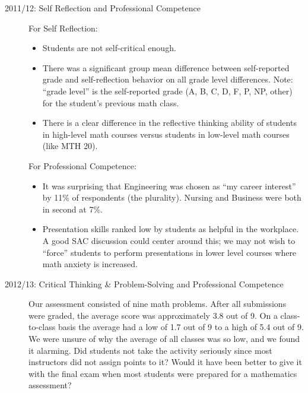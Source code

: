 \begin{description}

	\item[2011/12: Self Reflection and Professional Competence]
	For Self Reflection:
	\begin{itemize}
		\item Students are not self-critical enough.
		\item There was a significant group mean difference between self-reported grade
		and self-reflection behavior on all grade level differences.  Note: ``grade
		level'' is the self-reported grade (A, B, C, D, F, P, NP, other) for the
		student's previous math class.
		\item There is a clear difference in the reflective thinking ability of students
		in high-level math courses versus students in low-level math courses (like MTH
		20).
	\end{itemize}
	For Professional Competence:
	\begin{itemize}
		\item It was surprising that Engineering was chosen as ``my career interest'' by
		11\% of respondents (the plurality). Nursing and Business were both in second
		at 7\%.
		\item Presentation skills ranked low by students as helpful in the workplace.
		A good SAC discussion could center around this; we may not
		wish to ``force'' students to perform presentations in lower level courses where math
		anxiety is increased.
	\end{itemize}

	\item[2012/13:  Critical Thinking \& Problem-Solving and Professional Competence]

	Our assessment consisted of nine math problems.  After all submissions were
	graded, the average score was approximately 3.8 out of 9.  On a class-to-class
	basis the average had a low of 1.7 out of 9 to a high of 5.4 out of 9.  We were
	unsure of why the average of all classes was so low, and we found it alarming.
	Did students not take the activity seriously since most instructors did not
	assign points to it?  Would it have been better to give it with the final exam
	when most students were prepared for a mathematics assessment?


\end{description}
